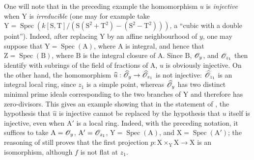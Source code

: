 \begin{env}[11.7.4]
\label{IV.11.7.4}
One will note that in the preceding example the homomorphism $u$ is \emph{injective} when $\mathrm{Y}$ is \emph{irreducible} (one may for example take $\mathrm{Y}=\operatorname{Spec}(k[\mathrm{S},\mathrm{T}]/(\mathrm{S}(\mathrm{S}^2+\mathrm{T}^2)-(\mathrm{S}^2-\mathrm{T}^2)))$, a ``cubic with a double point''). Indeed, after replacing $\mathrm{Y}$ by an affine neighbourhood of $y$, one may suppose that $\mathrm{Y}=\operatorname{Spec}(\mathrm{A})$, where $\mathrm{A}$ is integral, and hence that $\mathrm{Z}=\operatorname{Spec}(\mathrm{B})$, where $\mathrm{B}$ is the integral closure of $\mathrm{A}$. Since $\mathrm{B}$, $\mathscr{O}_y$, and $\mathscr{O}_{z_1}$ then identify with subrings of
the field of fractions of $\mathrm{A}$, $u$ is obviously injective.
On the other hand, the homomorphism $\widehat{u}:\widehat{\mathscr{O}}_y\to\widehat{\mathscr{O}}_{z_1}$ is not injective: $\widehat{\mathscr{O}}_{z_1}$ is an integral local ring, since $z_1$ is a simple point, whereas $\widehat{\mathscr{O}}_y$ has two distinct minimal prime ideals corresponding to the two branches of $\mathrm{Y}$ and therefore has zero-divisors.
This gives an example showing that in the statement of , the hypothesis that $\widehat{u}$ is injective cannot be replaced by the hypothesis that $u$ itself is injective, even when $\mathrm{A}'$ is a local ring.
Indeed, with the preceding notation, it suffices to take $\mathrm{A}=\mathscr{O}_y$, $\mathrm{A}'=\mathscr{O}_{z_1}$, $\mathrm{Y}=\operatorname{Spec}(\mathrm{A})$, and $\mathrm{X}=\operatorname{Spec}(\mathrm{A}')$; the reasoning of  still proves that the first projection $p:\mathrm{X}\times_\mathrm{Y}\mathrm{X}\to\mathrm{X}$ is an isomorphism, although $f$ is not flat at $z_1$.
\end{env}

